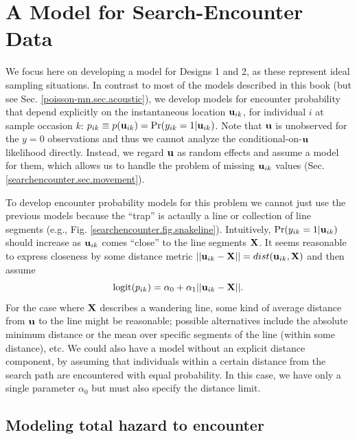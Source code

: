 \section{A Model for Search-Encounter Data}

We focus here on developing a model for Designs 1 and 2, as these
represent ideal sampling situations.  In contrast to most of the models
described in this book (but see Sec. \ref{poisson-mn.sec.acoustic}), we
develop models for encounter probability that depend explicitly on the
instantaneous location ${\bf u}_{ik}$, for individual $i$ at sample
occasion $k$: $p_{ik} \equiv p({\bf u}_{ik}) = \Pr(y_{ik}=1|{\bf
  u}_{ik})$.  Note that ${\bf u}$ is unobserved for the $y=0$
observations and thus we cannot analyze the conditional-on-${\bf u}$
likelihood directly. Instead, we regard ${\bf u}$ as random effects
and assume a model for them, which allows us to handle the
problem of missing ${\bf u}_{ik}$ values (Sec. \ref{searchencounter.sec.movement}).


To develop encounter probability models for this problem we cannot
just use the previous models because the ``trap'' is actaully a line
or collection of line segments (e.g.,
Fig. \ref{searchencounter.fig.snakeline}).  Intuitively,
$\Pr(y_{ik}=1|{\bf u}_{ik})$ should increase as ${\bf u}_{ik}$ comes
``close'' to the line segments ${\bf X}$. It seems reasonable to
express closeness by some distance metric $||{\bf u}_{ik} - {\bf X}
|| = dist( {\bf u}_{ik}, {\bf X})$ and then assume
\[
\mbox{logit}(p_{ik}) = \alpha_{0} + \alpha_{1} ||{\bf u}_{ik} - {\bf X}||.
\]
For the case where ${\bf X}$ describes a wandering line, some
kind of average distance from ${\bf u}$ to the line
might be reasonable; possible alternatives include the absolute
minimum distance or the mean over specific segments
of the line (within some distance), etc.  We could also have a model
without an explicit distance component, by assuming that individuals
within a certain distance from the search path are encountered with
equal probability. In this case, we have only a single parameter
$\alpha_{0}$ but must also specify the distance limit. 

\subsection{Modeling total hazard to encounter}

